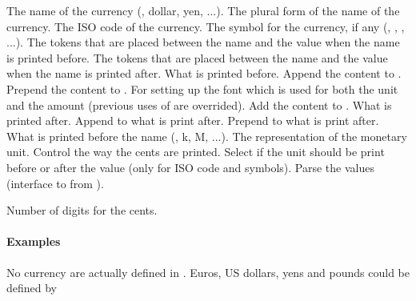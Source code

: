 \documentclass[12pt,add-index]{cnltx-doc}
\begin{document}
\begin{options}
     The name of the currency (\eg, dollar, yen, ...).
     The plural form of the name of the currency.
     The ISO code of the currency.
    \Default{\textcurrency} The symbol for the currency, if any (\eg, \cEUR[kind=symbol], \cUSD[kind=symbol], ...).
	The tokens that are placed between the name and the value when the name 
	is printed before. 
	The tokens that are placed between the name and the value when the name 
	is printed after. 
    \Default{} What is printed before. 
     Append the content to .
     Prepend the content to .
     For setting up the font which is used for both the unit and the amount (previous uses of  are overrided).
     Add the content to .
     What is printed after.
     Append to what is print after.
     Prepend to what is print after.
    \Default What is printed before the name (\eg, k, M, ...).
    The representation of the monetary unit.
    Control the way the cents are printed.
     Select if the unit should be print before or after the value (only for ISO code and symbols).
     Parse the values (interface to  from ).

     Number of digits for the cents.
\end{options}


\paragraph*{Examples}

No currency are actually defined in .
Euros, US dollars, yens and pounds could be defined by 
\begin{sourcecode}[add-sourcecode-options={deletedelim=*[s][\color{math}]{$}{$}}]
\end{sourcecode}
\end{document}
